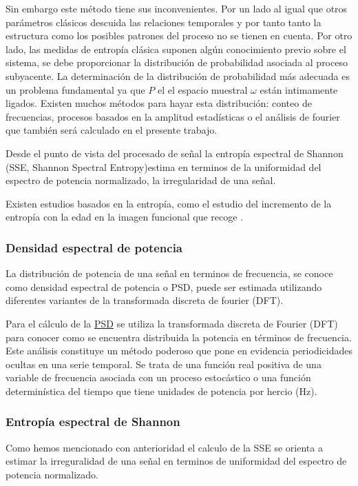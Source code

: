 Sin embargo este método tiene sus inconvenientes. Por un lado al igual que otros parámetros clásicos descuida las relaciones temporales y por tanto tanto la estructura como los posibles patrones del proceso no se tienen en cuenta. Por otro lado, las medidas de entropía clásica suponen algún conocimiento previo sobre el sistema, se debe proporcionar la distribución de probabilidad asociada al proceso subyacente. La determinación de la distribución de probabilidad más adecuada es un problema fundamental ya que $P$ el el espacio muestral $\omega$ están intimamente ligados. Existen muchos métodos para hayar esta distribución: conteo de frecuencias, procesos basados en la amplitud estadísticas o el análisis de fourier que también será calculado en el presente trabajo. 

Desde el punto de vista del procesado de señal la entropía espectral de Shannon (SSE, Shannon Spectral Entropy)estima en terminos de la uniformidad del espectro de potencia normalizado, la irregularidad de una señal.

Existen estudios basados en la entropía, como el estudio del incremento de la entropía con la edad en la imagen funcional que recoge \cite{Yao2013}. 

\subsubsection{Densidad espectral de potencia}

La distribución de potencia de una señal en terminos de frecuencia, se conoce como densidad espectral de potencia o PSD, puede ser estimada utilizando diferentes variantes de la transformada discreta de fourier (DFT).

Para el cálculo de la \hyperref[glos:psd]{PSD} se utiliza la transformada discreta de Fourier (DFT) para conocer como se encuentra distribuida la potencia en términos de frecuencia. Este análisis constituye un método poderoso que pone en evidencia periodicidades ocultas en una serie temporal. Se trata de una función real positiva de una variable de frecuencia asociada con un proceso estocástico o una función determinística del tiempo que tiene unidades de potencia por hercio (Hz). 

\subsubsection{Entropía espectral de Shannon}

Como hemos mencionado con anterioridad el calculo de la SSE se orienta a estimar la irreguralidad de una señal en terminos de uniformidad del espectro de potencia normalizado.

